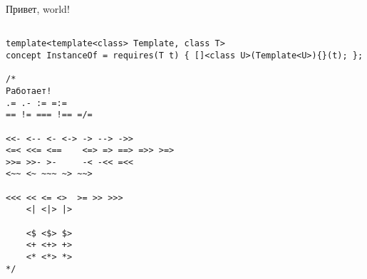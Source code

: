 \documentclass[11pt,twoside,openany]{book}
\begin{document}
Привет, world!

\begin{verbatim}

template<template<class> Template, class T>
concept InstanceOf = requires(T t) { []<class U>(Template<U>){}(t); };

/*
Работает!
.= .- := =:=
== != === !== =/=

<<- <-- <- <-> -> --> ->>
<=< <<= <==    <=> => ==> =>> >=>
>>= >>- >-     -< -<< =<<
<~~ <~ ~~~ ~> ~~>

<<< << <= <>  >= >> >>>
    <| <|> |>

    <$ <$> $>
    <+ <+> +>
    <* <*> *>
*/
\end{verbatim}
  
\end{document}
